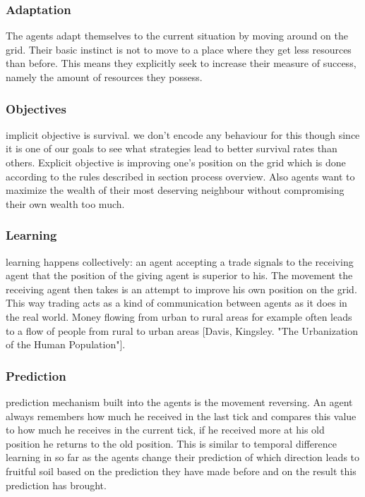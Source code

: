 \documentclass{JASSS}
\begin{document}
\subsubsection{Adaptation}
	The agents adapt themselves to the current situation by moving around on the grid. Their basic instinct is not to move to a place where they get less resources than before. This means they explicitly seek to increase their measure of success, namely the amount of resources they possess.

\subsubsection{Objectives}
	implicit objective is survival. we don't encode any behaviour for this though since it is one of our goals to see what strategies lead to better survival rates than others. Explicit objective is improving one's position on the grid which is done according to the rules described in section process overview. Also agents want to maximize the wealth of their most deserving neighbour without compromising their own wealth too much.

\subsubsection{Learning}
	learning happens collectively: an agent accepting a trade signals to the receiving agent that the position of the giving agent is superior to his. The movement the receiving agent then takes is an attempt to improve his own position on the grid. This way trading acts as a kind of communication between agents as it does in the real world. Money flowing from urban to rural areas for example often leads to a flow of people from rural to urban areas [Davis, Kingsley. "The Urbanization of the Human Population"].

\subsubsection{Prediction}
	 prediction mechanism built into the agents is the movement reversing. An agent always remembers how much he received in the last tick and compares this value to how much he receives in the current tick, if he received more at his old position he returns to the old position. This is similar to temporal difference learning in so far as the agents change their prediction of which direction leads to fruitful soil based on the prediction they have made before and on the result this prediction has brought.
\end{document}
